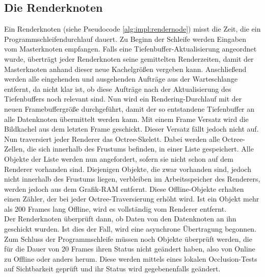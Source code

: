 \subsection{Die Renderknoten}
\label{sec:impl:render}
Ein Renderknoten (siehe Pseudocode \ref{alg:impl:rendernode}) misst die Zeit, die ein Programmschleifendurchlauf dauert. Zu Beginn der Schleife werden Eingaben vom Masterknoten empfangen. Falls eine Tiefenbuffer-Aktualisierung angeordnet wurde, überträgt jeder Renderknoten seine gemittelten Renderzeiten, damit der Masterknoten anhand dieser neue Kachelgrößen vergeben kann. Anschließend werden alle eingehenden und ausgehenden Aufträge aus der Warteschlange entfernt, da nicht klar ist, ob diese Aufträge nach der Aktualisierung des Tiefenbuffers noch relevant sind. Nun wird ein Rendering-Durchlauf mit der neuen Framebuffergröße durchgeführt, damit der so entstandene Tiefenbuffer an alle Datenknoten übermittelt werden kann. Mit einem Frame Versatz wird die Bildkachel aus dem letzten Frame geschickt. Dieser Versatz fällt jedoch nicht auf. Nun traversiert jeder Renderer das Octree-Skelett. Dabei werden alle Octree-Zellen, die sich innerhalb des Frustums befinden, in einer Liste gespeichert. Alle Objekte der Liste werden nun angefordert, sofern sie nicht schon auf dem Renderer vorhanden sind. Diejenigen Objekte, die zwar vorhanden sind, jedoch nicht innerhalb des Frustums liegen, verbleiben im Arbeitsspeicher des Renderers, werden jedoch aus dem Grafik-RAM entfernt. Diese Offline-Objekte erhalten einen Zähler, der bei jeder Octree-Traversierung erhöht wird. Ist ein Objekt mehr als 200 Frames lang Offline, wird es vollständig vom Renderer entfernt.\\
Der Renderknoten überprüft dann, ob Daten von den Datenknoten an ihn geschickt wurden. Ist dies der Fall, wird eine asynchrone Übertragung begonnen. Zum Schluss der Programmschleife müssen noch Objekte überprüft werden, die für die Dauer von 20 Frames ihren Status nicht geändert haben, also von Online zu Offline oder anders herum. Diese werden mittels eines lokalen Occlusion-Tests auf Sichtbarkeit geprüft und ihr Status wird gegebenenfalls geändert.
 
